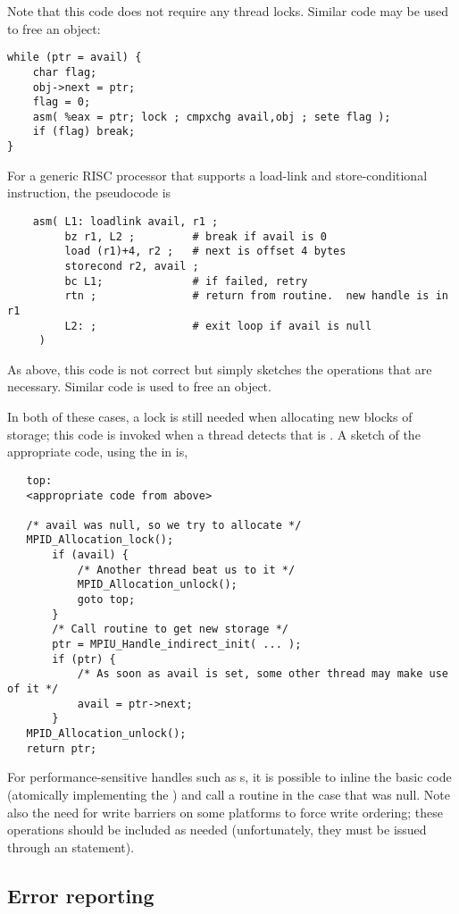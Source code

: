 \documentclass{article}
\begin{document}
Note that this code does not require any thread locks.  Similar code may be
used to free an object:
\begin{verbatim}
while (ptr = avail) {
    char flag;
    obj->next = ptr;
    flag = 0;
    asm( %eax = ptr; lock ; cmpxchg avail,obj ; sete flag );
    if (flag) break;
}
\end{verbatim}

For a generic RISC processor that supports a load-link and store-conditional
instruction, the pseudocode is
\begin{verbatim}
    asm( L1: loadlink avail, r1 ;
         bz r1, L2 ;         # break if avail is 0
         load (r1)+4, r2 ;   # next is offset 4 bytes
         storecond r2, avail ;
         bc L1;              # if failed, retry
         rtn ;               # return from routine.  new handle is in r1
         L2: ;               # exit loop if avail is null
     )
\end{verbatim}
As above, this  code is not correct but simply sketches the
operations that are necessary.  Similar code is used to free an object.

In both of these cases, a lock is still
needed when allocating new blocks of storage; this code is invoked when a
thread detects that  is .  A sketch of the appropriate
code, using the  in
 is, 
\begin{verbatim}
   top:
   <appropriate code from above>

   /* avail was null, so we try to allocate */
   MPID_Allocation_lock();
       if (avail) {
           /* Another thread beat us to it */
           MPID_Allocation_unlock();
           goto top;
       }   
       /* Call routine to get new storage */
       ptr = MPIU_Handle_indirect_init( ... );
       if (ptr) {
           /* As soon as avail is set, some other thread may make use of it */
           avail = ptr->next;
       }
   MPID_Allocation_unlock();
   return ptr;
\end{verbatim}
For performance-sensitive handles such as s, it is
possible to 
inline the basic code (atomically implementing the ) and call a routine in the case that 
was null.  Note also the need for write barriers on some platforms to
force write ordering; these operations should be included as needed
(unfortunately, they must be issued through an  statement).

\subsection{Error reporting}
\label{sec:error-reporting}
\end{document}
